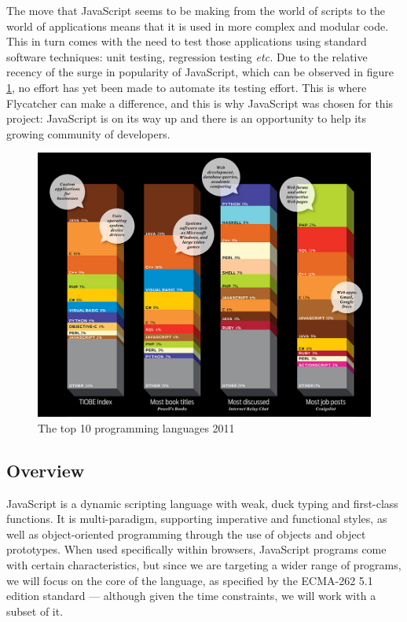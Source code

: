 The move that JavaScript seems to be making from the world of scripts to the world of applications means that it is used in more complex and modular code. This in turn comes with the need to test those applications using standard software techniques: unit testing, regression testing \emph{etc.} Due to the relative recency of the surge in popularity of JavaScript, which can be observed in figure \ref{TIOBEgraph}, no effort has yet been made to automate its testing effort. This is where \textsf{Flycatcher} can make a difference, and this is why JavaScript was chosen for this project: JavaScript is on its way up and there is an opportunity to help its growing community of developers.

\begin{figure}
\hspace*{-1.2cm}
\centering
\includegraphics[scale=0.45]{./components/chapter2/TIOBEgraph.jpeg}
\caption{The top 10 programming languages 2011 \cite{tiobe}}
\label{TIOBEgraph}
\end{figure}

\subsection{Overview}

JavaScript is a dynamic scripting language with weak, duck typing and first-class functions. It is multi-paradigm, supporting imperative and functional styles, as well as object-oriented programming through the use of objects and object prototypes. When used specifically within browsers, JavaScript programs come with certain characteristics, but since we are targeting a wider range of programs, we will focus on the core of the language, as specified by the ECMA-262 5.1 edition standard \cite{ecma} --- although given the time constraints, we will work with a subset of it.

